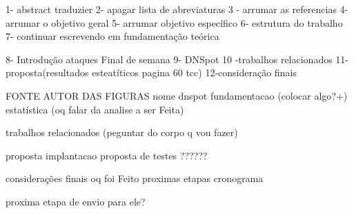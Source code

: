 
1- abstract traduzier
2- apagar lista de abreviaturas
3 - arrumar as referencias
4- arrumar o objetivo geral
5- arrumar objetivo específico
6- estrutura do trabalho
7- continuar escrevendo em fundamentação teórica

8- Introdução ataques Final de semana
9- DNSpot
10 -trabalhos relacionados
11-proposta(resultados esteatíticos pagina 60 tcc)
12-consideração finais

FONTE AUTOR DAS FIGURAS
nome dnspot
fundamentacao (colocar algo?+)
    estatística (oq falar da analise a ser Feita)
    
trabalhos relacionados (peguntar do corpo q vou fazer)

proposta
    implantacao
    proposta de testes ??????
    
considerações finais
    oq foi Feito
    proximas etapas
    cronograma
    
proxima etapa de envio para ele?
